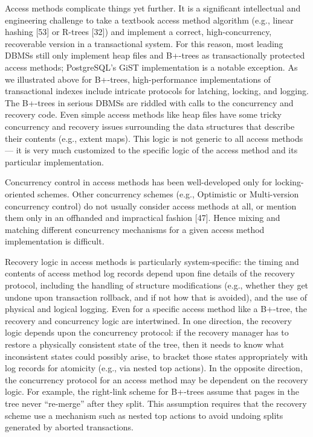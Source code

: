 \documentclass[b5paper,11pt,twoside,openright]{book}
\begin{document}
Access methods complicate things yet further. It is a significant
intellectual and engineering challenge to take a textbook access method
algorithm (e.g., linear hashing {[}53{]} or R-trees {[}32{]}) and
implement a correct, high-concurrency, recoverable version in a
transactional system. For this reason, most leading DBMSs still only
implement heap files and B+-trees as transactionally protected access
methods; PostgreSQL's GiST implementation is a notable exception. As we
illustrated above for B+-trees, high-performance implementations of
transactional indexes include intricate protocols for latching, locking,
and logging. The B+-trees in serious DBMSs are riddled with calls to the
concurrency and recovery code. Even simple access methods like heap
files have some tricky concurrency and recovery issues surrounding the
data structures that describe their contents (e.g., extent maps). This
logic is not generic to all access methods --- it is very much
customized to the specific logic of the access method and its particular
implementation.

Concurrency control in access methods has been well-developed only for
locking-oriented schemes. Other concurrency schemes (e.g., Optimistic or
Multi-version concurrency control) do not usually consider access
methods at all, or mention them only in an offhanded and impractical
fashion {[}47{]}. Hence mixing and matching different concurrency
mechanisms for a given access method implementation is difficult.

Recovery logic in access methods is particularly system-specific: the
timing and contents of access method log records depend upon fine
details of the recovery protocol, including the handling of structure
modifications (e.g., whether they get undone upon transaction rollback,
and if not how that is avoided), and the use of physical and logical
logging. Even for a specific access method like a B+-tree, the recovery
and concurrency logic are intertwined. In one direction, the recovery
logic depends upon the concurrency protocol: if the recovery manager has
to restore a physically consistent state of the tree, then it needs to
know what inconsistent states could possibly arise, to bracket those
states appropriately with log records for atomicity (e.g., via nested
top actions). In the opposite direction, the concurrency protocol for an
access method may be dependent on the recovery logic. For example, the
right-link scheme for B+-trees assume that pages in the tree never
``re-merge'' after they split. This assumption requires that the
recovery scheme use a mechanism such as nested top actions to avoid
undoing splits generated by aborted transactions.
\end{document}
